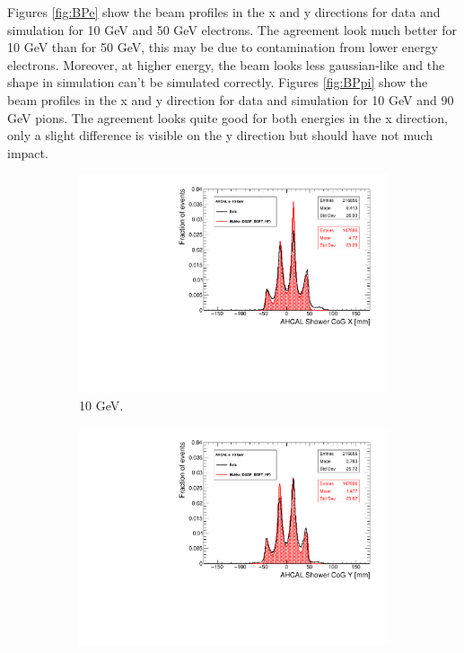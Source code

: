 Figures \ref{fig:BPe} show the beam profiles in the x and y directions for data and simulation for 10 GeV and 50 GeV electrons. The agreement look much better for 10 GeV than for 50 GeV, this may be due to contamination from lower energy electrons. Moreover, at higher energy, the beam looks less gaussian-like and the shape in simulation can't be simulated correctly. Figures \ref{fig:BPpi} show the beam profiles in the x and y direction for data and simulation for 10 GeV and 90 GeV pions. The agreement looks quite good for both energies in the x direction, only a slight difference is visible on the y direction but should have not much impact.

\begin{figure}[htbp!]
  \centering
  \begin{subfigure}[t]{0.49\textwidth}
    \includegraphics[width=1.\linewidth]{../Thesis_Plots/Timing/Electrons/Plots/Run24542_CoGX_AHCAL_10GeV_Comparison.pdf}
    \caption{10 GeV.} \label{fig:e10GeVX}
  \end{subfigure}
  \hfill
  \begin{subfigure}[t]{0.49\textwidth}
    \includegraphics[width=1.\linewidth]{../Thesis_Plots/Timing/Electrons/Plots/Run24542_CoGY_AHCAL_10GeV_Comparison.pdf}

\end{subfigure}
\end{figure}
